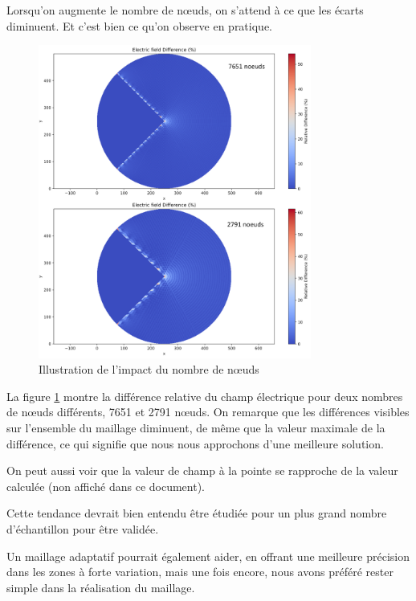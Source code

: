 \documentclass{article}
\begin{document}
Lorsqu'on augmente le nombre de nœuds, on s'attend à ce que les écarts
diminuent. Et c'est bien ce qu'on observe en pratique.

\begin{figure}[!h]
    \centering
    \includegraphics[width=0.8\textwidth]{img/difference_elec_7651.png}
    \caption{Illustration de l'impact du nombre de nœuds}
    \label{fig:nodes_number_impact}
\end{figure}

La figure \ref{fig:nodes_number_impact} montre la différence
relative du champ électrique pour deux nombres de nœuds
différents, 7651 et 2791 nœuds. On remarque que les
différences visibles sur l'ensemble du maillage diminuent,
de même que la valeur maximale de la différence, ce qui
signifie que nous nous approchons d'une meilleure solution.

On peut aussi voir que la valeur de champ à la pointe
se rapproche de la valeur calculée (non affiché dans ce document).

Cette tendance devrait bien entendu être étudiée pour un
plus grand nombre d'échantillon pour être validée.

Un maillage adaptatif pourrait également aider,
 en offrant une meilleure précision dans les
zones à forte variation, mais une fois encore,
nous avons préféré rester simple dans la réalisation
du maillage.

\newpage
\end{document}
